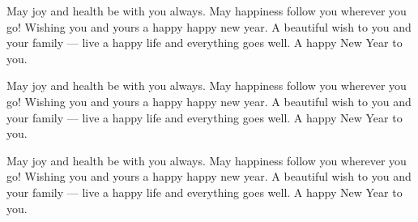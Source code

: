 {May joy and health be with you always. May happiness follow you wherever you go! Wishing you and yours a happy happy new year. A beautiful wish to you and your family --- live a happy life and everything goes well. A happy New Year to you. 

May joy and health be with you always. May happiness follow you wherever you go! Wishing you and yours a happy happy new year. A beautiful wish to you and your family --- live a happy life and everything goes well. A happy New Year to you. 

May joy and health be with you always. May happiness follow you wherever you go! Wishing you and yours a happy happy new year. A beautiful wish to you and your family --- live a happy life and everything goes well. A happy New Year to you. 

}

\makeenabstract